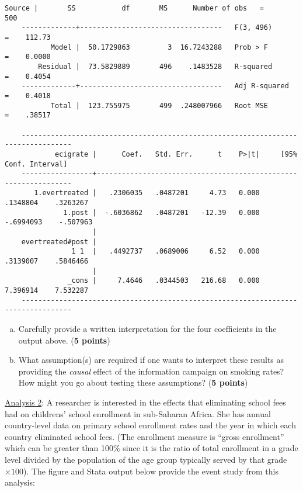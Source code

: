 \documentclass[12pt]{article}
\begin{document}
\bigskip
\scriptsize
\begin{Verbatim}[tabsize=10]
	      Source |       SS           df       MS      Number of obs   =       500
	-------------+----------------------------------   F(3, 496)       =    112.73
	       Model |  50.1729863         3  16.7243288   Prob > F        =    0.0000
	    Residual |  73.5829889       496    .1483528   R-squared       =    0.4054
	-------------+----------------------------------   Adj R-squared   =    0.4018
	       Total |  123.755975       499  .248007966   Root MSE        =    .38517
	
	----------------------------------------------------------------------------------
	        ecigrate |      Coef.   Std. Err.      t    P>|t|     [95% Conf. Interval]
	-----------------+----------------------------------------------------------------
	   1.evertreated |   .2306035   .0487201     4.73   0.000     .1348804    .3263267
	          1.post |  -.6036862   .0487201   -12.39   0.000    -.6994093    -.507963
	                 |
	evertreated#post |
	            1 1  |   .4492737   .0689006     6.52   0.000     .3139007    .5846466
	                 |
	           _cons |     7.4646   .0344503   216.68   0.000     7.396914    7.532287
	----------------------------------------------------------------------------------
\end{Verbatim}
\normalsize
\bigskip

\begin{enumerate}[(a)]
\setlength\itemsep{2em}

\item Carefully provide a written interpretation for the four coefficients in the output above. ({\bf 5 points})

\item What assumption(s) are required if one wants to interpret these results as providing the \textit{causal} effect of the information campaign on smoking rates? How might you go about testing these assumptions? ({\bf 5 points})
\end{enumerate}
\bigskip

\underline{Analysis 2}: A researcher is interested in the effects that eliminating school fees had on childrens' school enrollment in sub-Saharan Africa. She has annual country-level data on primary school enrollment rates and the year in which each country eliminated school fees. (The enrollment measure is ``gross enrollment'' which can be greater than 100\% since it is the ratio of total enrollment in a grade level divided by the population of the age group typically served by that grade $\times 100$). The figure and Stata output below provide the event study from this analysis:
\end{document}

